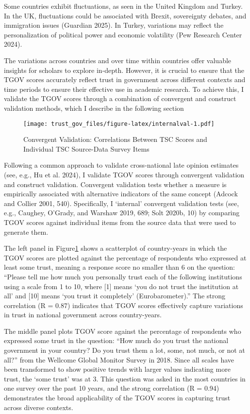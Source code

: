 \documentclass[
  12pt,
]{article}
\begin{document}
Some countries exhibit fluctuations, as seen in the United Kingdom and Turkey.
In the UK, fluctuations could be associated with Brexit, sovereignty debates, and immigration issues (Guardian 2025).
In Turkey, variations may reflect the personalization of political power and economic volatility (Pew Research Center 2024).

The variations across countries and over time within countries offer valuable insights for scholars to explore in-depth.
However, it is crucial to ensure that the TGOV scores accurately reflect trust in government across different contexts and time periods to ensure their effective use in academic research.
To achieve this, I validate the TGOV scores through a combination of convergent and construct validation methods, which I describe in the following section

\begin{figure}
\centering
\texttt{[image: trust\_gov\_files/figure-latex/internalval-1.pdf]}
\caption{\label{fig:internalval}Convergent Validation: Correlations Between TSC Scores and Individual TSC Source-Data Survey Items \label{internal_val}}
\end{figure}

Following a common approach to validate cross-national late opinion estimates (see, e.g., Hu et al. 2024), I validate TGOV scores through convergent validation and construct validation.
Convergent validation tests whether a measure is empirically associated with alternative indicators of the same concept (Adcock and Collier 2001, 540).
Specifically, I `internal' convergent validation tests (see, e.g., Caughey, O'Grady, and Warshaw 2019, 689; Solt 2020b, 10) by comparing TGOV scores against individual items from the source data that were used to generate them.

The left panel in Figure\nobreakspace{}\ref{internal_val} shows a scatterplot of country-years in which the TGOV scores are plotted against the percentage of respondents who expressed at least some trust, meaning a response score no smaller than 6 on the question: ``Please tell me how much you personally trust each of the following institutions using a scale from 1 to 10, where {[}1{]} means `you do not trust the institution at all' and {[}10{]} means `you trust it completely' (Eurobarometer).''
The strong correlation (R = 0.87) indicates that TGOV scores effectively capture variations in trust in national government across country-years.

The middle panel plots TGOV score against the percentage of respondents who expressed some trust in the question: ``How much do you trust the national government in your country? Do you trust them a lot, some, not much, or not at all?'' from the Wellcome Global Monitor Survey in 2018.
Since all scales have been transformed to show positive trends with larger values indicating more trust, the `some trust' was at 3.
This question was asked in the most countries in one survey over the past 10 years, and the strong correlation (R = 0.94) demonstrates the broad applicability of the TGOV scores in capturing trust across diverse contexts.
\end{document}
